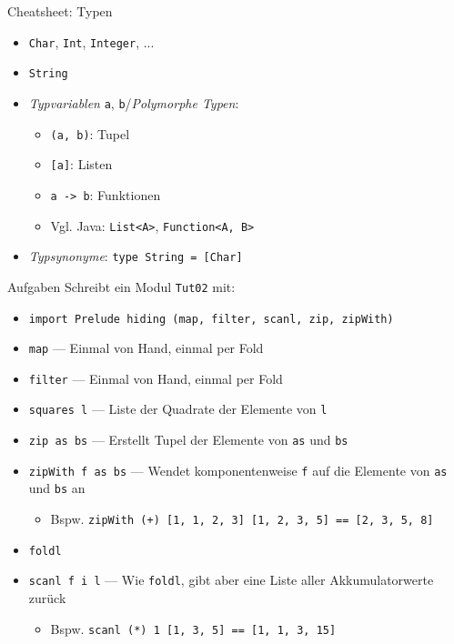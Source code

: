 \documentclass{beamer}
\begin{document}
\begin{frame}{Cheatsheet: Typen}
  \begin{itemize}
    \item \texttt{Char}, \texttt{Int}, \texttt{Integer}, ...
    \item \texttt{String}
    \item \emph{Typvariablen} \texttt{a}, \texttt{b}/\emph{Polymorphe Typen}:
    \begin{itemize}
      \item \texttt{(a, b)}: Tupel
      \item \texttt{[a]}: Listen
      \item \texttt{a -> b}: Funktionen
      \item Vgl. Java: \texttt{List<A>}, \texttt{Function<A, B>}
    \end{itemize}
    \item \emph{Typsynonyme}: \texttt{type String = [Char]}
  \end{itemize}
\end{frame}

\begin{frame}{Aufgaben}
	Schreibt ein Modul \texttt{Tut02} mit:

	\begin{itemize}
		\item \texttt{import Prelude hiding (map, filter, scanl, zip, zipWith)}
		\item \texttt{map} --- Einmal von Hand, einmal per Fold
		\item \texttt{filter} --- Einmal von Hand, einmal per Fold
		\item \texttt{squares l} --- Liste der Quadrate der Elemente von \texttt{l}
		\item \texttt{zip as bs} --- Erstellt Tupel der Elemente von \texttt{as} und \texttt{bs}
		\item \texttt{zipWith f as bs} --- Wendet komponentenweise \texttt{f} auf die Elemente von \texttt{as} und \texttt{bs} an
		\begin{itemize}
			\item Bspw. \texttt{zipWith (+) [1, 1, 2, 3] [1, 2, 3, 5] == [2, 3, 5, 8]}
		\end{itemize}
   		\pause
		\item \texttt{foldl}
		\item \texttt{scanl f i l} --- Wie \texttt{foldl}, gibt aber eine Liste aller Akkumulatorwerte zurück
		\begin{itemize}
			\item Bspw. \texttt{scanl (*) 1 [1, 3, 5] == [1, 1, 3, 15]}
		\end{itemize}
	\end{itemize}
\end{frame}
\end{document}
